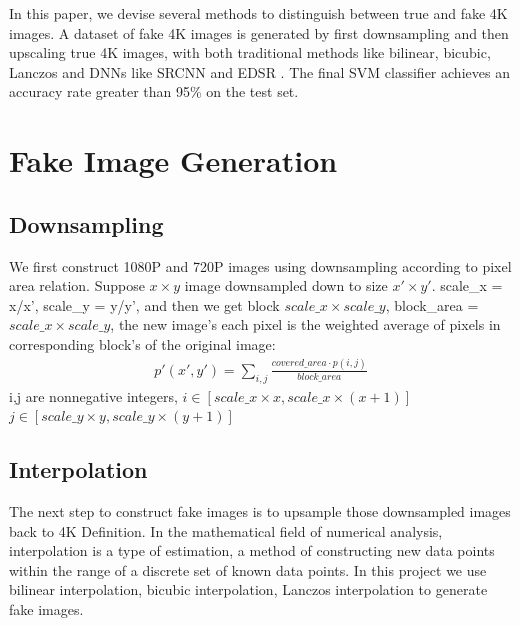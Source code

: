 \documentclass[journal,conference]{IEEEtran}
\begin{document}
In this paper, we devise several methods to distinguish between true and fake 4K images. A dataset of fake 4K images is generated by first downsampling and then upscaling true 4K images, with both traditional methods like bilinear, bicubic, Lanczos and DNNs like SRCNN \cite{dong2015image} and EDSR \cite{lim2017enhanced}. The final SVM classifier achieves an accuracy rate greater than 95\% on the test set.

\section{Fake Image Generation}

\subsection{Downsampling}
We first construct 1080P and 720P images using downsampling according to pixel area relation. Suppose $x\times y$ image downsampled down to size $x'\times y'$. scale\_x = x/x', scale\_y = y/y', and then we get block $scale\_x \times scale\_y$, block\_area = $scale\_x \times scale\_y$, the new image's each pixel is the weighted average of pixels in corresponding block's of the original image: 
\begin{align*}
	p'(x',y')=\sum_{i,j}{\frac{covered\_area \cdot p(i,j)}{block\_area}}
\end{align*}
i,j are nonnegative integers, $i \in [scale\_x\times x,scale\_x\times (x+1)]$ $j \in [scale\_y\times y,scale\_y\times (y+1)]$

\subsection{Interpolation}
The next step to construct fake images is to upsample those downsampled images back to 4K Definition.
In the mathematical field of numerical analysis, interpolation is a type of estimation, a method of constructing new data points within the range of a discrete set of known data points.
In this project we use bilinear interpolation, bicubic interpolation, Lanczos interpolation to generate fake images.
\end{document}
